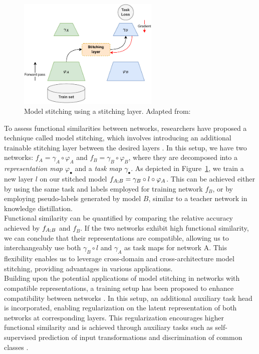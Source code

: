 \documentclass[../main.tex]{subfiles}
\begin{document}
\begin{figure}[!ht]
    \centering
    \includegraphics[width=0.6\textwidth]{figures/bg/stitchingLayer.pdf} 
    \caption{Model stitching using a stitching layer. Adapted from: \cite{csiszarik_similarity_2021}}
    \label{fig:stich_lay}
\end{figure}

To assess functional similarities between networks, researchers have proposed a technique called model stitching, which involves introducing an additional trainable stitching layer between the desired layers \cite{csiszarik_similarity_2021, bansal_revisiting_2021, li_convergent_2016}. In this setup, we have two networks: $f_A = \gamma_A \circ \varphi_A$ and $f_B = \gamma_B \circ \varphi_B$, where they are decomposed into a \emph{representation map $\varphi_\bullet$} and a \emph{task map $\gamma_\bullet$}. As depicted in Figure~\ref{fig:stich_lay}, we train a new layer $l$ on our stitched model $f_{A \mathbin{;} B} = \gamma_B \circ l \circ \varphi_A$. This can be achieved either by using the same task and labels employed for training network $f_B$, or by employing pseudo-labels generated by model $B$, similar to a teacher network in knowledge distillation.\\


Functional similarity can be quantified by comparing the relative accuracy achieved by $f_{A \mathbin{;} B}$ and $f_B$. If the two networks exhibit high functional similarity, we can conclude that their representations are compatible, allowing us to interchangeably use both $\gamma_B \circ l$ and $\gamma_A$ as task maps for network A. This flexibility enables us to leverage cross-domain and cross-architecture model stitching, providing advantages in various applications.\\

Building upon the potential applications of model stitching in networks with compatible representations, a training setup has been proposed to enhance compatibility between networks \cite{gygli_towards_2020}. In this setup, an additional auxiliary task head is incorporated, enabling regularization on the latent representation of both networks at corresponding layers. This regularization encourages higher functional similarity and is achieved through auxiliary tasks such as self-supervised prediction of input transformations and discrimination of common classes \cite{gygli_towards_2020}.\\
\end{document}
